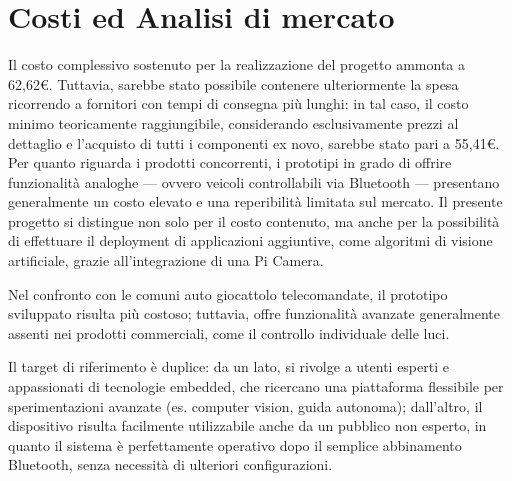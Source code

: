 \documentclass{article}
\begin{document}
\newpage
\section{Costi ed Analisi di mercato}
Il costo complessivo sostenuto per la realizzazione del progetto ammonta a 62,62€. Tuttavia, sarebbe stato possibile contenere ulteriormente la spesa ricorrendo a fornitori con tempi di consegna più lunghi: in tal caso, il costo minimo teoricamente raggiungibile, considerando esclusivamente prezzi al dettaglio e l'acquisto di tutti i componenti ex novo, sarebbe stato pari a 55,41€.
\newline
Per quanto riguarda i prodotti concorrenti, i prototipi in grado di offrire funzionalità analoghe — ovvero veicoli controllabili via Bluetooth — presentano generalmente un costo elevato e una reperibilità limitata sul mercato. Il presente progetto si distingue non solo per il costo contenuto, ma anche per la possibilità di effettuare il deployment di applicazioni aggiuntive, come algoritmi di visione artificiale, grazie all'integrazione di una Pi Camera.

Nel confronto con le comuni auto giocattolo telecomandate, il prototipo sviluppato risulta più costoso; tuttavia, offre funzionalità avanzate generalmente assenti nei prodotti commerciali, come il controllo individuale delle luci.

Il target di riferimento è duplice: da un lato, si rivolge a utenti esperti e appassionati di tecnologie embedded, che ricercano una piattaforma flessibile per sperimentazioni avanzate (es. computer vision, guida autonoma); dall’altro, il dispositivo risulta facilmente utilizzabile anche da un pubblico non esperto, in quanto il sistema è perfettamente operativo dopo il semplice abbinamento Bluetooth, senza necessità di ulteriori configurazioni.
\end{document}
